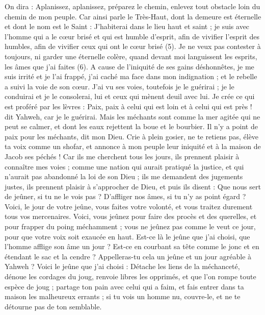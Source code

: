 \begin{multicols}{2}
{On dira : Aplanissez, aplanissez, préparez le chemin, enlevez tout obstacle loin du chemin de mon peuple.
Car ainsi parle le Très-Haut, dont la demeure est éternelle et dont le nom est le Saint : J'habiterai dans le lieu haut et saint ; je suis avec l’homme qui a le cœur brisé et qui est humble d'esprit, afin de vivifier l'esprit des humbles, afin de vivifier ceux qui ont le cœur brisé (5).
Je ne veux pas contester à toujours, ni garder une éternelle colère, quand devant moi languissent les esprits, les âmes que j’ai faites (6).
A cause de l'iniquité de ses gains déshonnêtes, je me suis irrité et je l’ai frappé, j’ai caché ma face dans mon indignation ; et le rebelle a suivi la voie de son cœur.
J'ai vu ses voies, toutefois je le guérirai ; je le conduirai et je le consolerai, lui et ceux qui mènent deuil avec lui.
Je crée ce qui est proféré par les lèvres : Paix, paix à celui qui est loin et à celui qui est près ! dit Yahweh, car je le guérirai.
Mais les méchants sont comme la mer agitée qui ne peut se calmer, et dont les eaux rejettent la boue et le bourbier.
Il n'y a point de paix pour les méchants, dit mon Dieu.
\VerseOne{}Crie à plein gosier, ne te retiens pas, élève ta voix comme un shofar, et annonce à mon peuple leur iniquité et à la maison de Jacob ses péchés !
Car ils me cherchent tous les jours, ils prennent plaisir à connaître mes voies ; comme une nation qui aurait pratiqué la justice, et qui n'aurait pas abandonné la loi de son Dieu ; ils me demandent des jugements justes, ils prennent plaisir à s’approcher de Dieu, et puis ils disent :
Que nous sert de jeûner, si tu ne le vois pas ? D’affliger nos âmes, si tu n’y as point égard ? Voici, le jour de votre jeûne, vous faites votre volonté, et vous traitez durement tous vos mercenaires.
Voici, vous jeûnez pour faire des procès et des querelles, et pour frapper du poing méchamment ; vous ne jeûnez pas comme le veut ce jour, pour que votre voix soit exaucée en haut.
Est-ce là le jeûne que j'ai choisi, que l'homme afflige son âme un jour ? Est-ce en courbant sa tête comme le jonc et en étendant le sac et la cendre ? Appelleras-tu cela un jeûne et un jour agréable à Yahweh ?
Voici le jeûne que j'ai choisi : Détache les liens de la méchanceté, dénoue les cordages du joug, renvoie libres les opprimés, et que l’on rompe toute espèce de joug ;
partage ton pain avec celui qui a faim, et fais entrer dans ta maison les malheureux errants ; si tu vois un homme nu, couvre-le, et ne te détourne pas de ton semblable.
}
\end{multicols}
